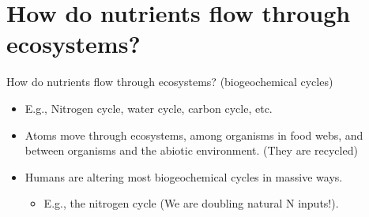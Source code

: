 
\section{How do nutrients flow through ecosystems?}

\begin{frame}[t]
    \begin{adjustwidth}{-2em}{-1.5em}
        How do nutrients flow through ecosystems? (biogeochemical cycles)

        \begin{itemize}[<+->]
            \item E.g., Nitrogen cycle, water cycle, carbon cycle, etc.

                \vspace{8mm}
            \item Atoms move through ecosystems, among organisms in food webs,
                and between organisms and the abiotic environment. (They are
                recycled)

                \vspace{8mm}
            \item Humans are altering most biogeochemical cycles in
                massive ways.

                \begin{itemize}
                    \item E.g., the nitrogen cycle (We are doubling natural N
                        inputs!).
                \end{itemize}
        \end{itemize}

    \end{adjustwidth}
\end{frame}

